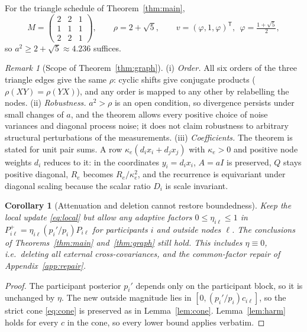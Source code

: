\documentclass[11pt,a4paper]{article}
\numberwithin{equation}{section}
\newtheorem{corollary}[theorem]{Corollary}
\theoremstyle{remark}\newtheorem{remark}[theorem]{Remark}
\newcommand{\T}{^{\mathsf T}}
\begin{document}
For the triangle schedule of Theorem~\ref{thm:main},
\[
M=\begin{pmatrix}2&2&1\\1&1&1\\2&2&1\end{pmatrix},\qquad\rho=2+\sqrt5,\qquad v=(\varphi,1,\varphi)\T,\ \ \varphi=\tfrac{1+\sqrt5}{2},
\]
so $a^2\ge2+\sqrt5\approx4.236$ suffices.

\begin{remark}[Scope of Theorem~\ref{thm:graph}]\label{rem:graph}
(i) \emph{Order.} All six orders of the three triangle edges give the same $\rho$: cyclic shifts
give conjugate products ($\rho(XY)=\rho(YX)$), and any order is mapped to any other by relabelling
the nodes. (ii) \emph{Robustness.} $a^2>\rho$ is an open condition, so divergence persists under
small changes of $a$, and the theorem allows every positive choice of noise variances and
diagonal process noise; it does not claim robustness to arbitrary structural perturbations of
the measurements. (iii) \emph{Coefficients.} The theorem is stated for unit pair sums. A row
$\kappa_e(d_ix_i+d_jx_j)$ with $\kappa_e>0$ and positive node weights $d_i$ reduces to it: in the
coordinates $y_i=d_ix_i$, $A=aI$ is preserved, $Q$ stays positive diagonal, $R_e$ becomes
$R_e/\kappa_e^2$, and the recurrence is equivariant under diagonal scaling because the scalar
ratio $D_i$ is scale invariant.
\end{remark}

\begin{corollary}[Attenuation and deletion cannot restore boundedness]\label{cor:atten}
Keep the local update \eqref{eq:local} but allow any adaptive factors $0\le\eta_{i\ell}\le1$ in
$P_{i\ell}^+=\eta_{i\ell}(p_i'/p_i)P_{i\ell}$ for participants $i$ and outside nodes $\ell$. The
conclusions of Theorems~\ref{thm:main} and~\ref{thm:graph} still hold. This includes
$\eta\equiv0$, i.e.\ deleting all external cross-covariances, and the common-factor repair of
Appendix~\ref{app:repair}.
\end{corollary}

\begin{proof}
The participant posterior $p_i'$ depends only on the participant block, so it is unchanged by
$\eta$. The new outside magnitude lies in $[0,(p_i'/p_i)c_{i\ell}]$, so the strict cone
\eqref{eq:cone} is preserved as in Lemma~\ref{lem:cone}. Lemma~\ref{lem:harm} holds for every
$c$ in the cone, so every lower bound applies verbatim.
\end{proof}
\end{document}

